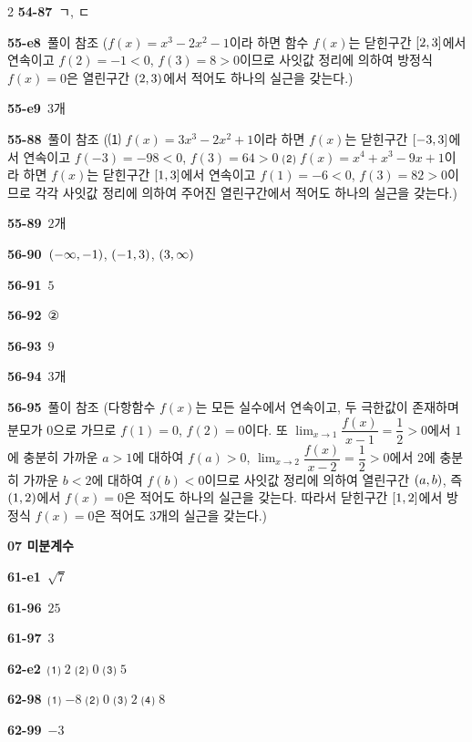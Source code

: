 \documentclass[10pt,a4paper]{article}
\begin{document}
\begin{multicols}{2}
\noindent\textbf{54-87}\ ㄱ, ㄷ\par
\noindent\textbf{55-e8}\ 풀이 참조 ($f(x)=x^3-2x^2-1$이라 하면 함수 $f(x)$는 닫힌구간 $[2{,}\mkern3mu\mathopen{}3]$에서 연속이고 $f(2)=-1<0$, $f(3)=8>0$이므로 사잇값 정리에 의하여 방정식 $f(x)=0$은 열린구간 $(2{,}\mkern3mu\mathopen{}3)$에서 적어도 하나의 실근을 갖는다.)\par
\noindent\textbf{55-e9}\ $3$개\par
\noindent\textbf{55-88}\ 풀이 참조 (⑴ $f(x)=3x^3-2x^2+1$이라 하면 $f(x)$는 닫힌구간 $[-3{,}\mkern3mu\mathopen{}3]$에서 연속이고 $f(-3)=-98<0$, $f(3)=64>0$ ⑵ $f(x)=x^4+x^3-9x+1$이라 하면 $f(x)$는 닫힌구간 $[1{,}\mkern3mu\mathopen{}3]$에서 연속이고 $f(1)=-6<0$, $f(3)=82>0$이므로 각각 사잇값 정리에 의하여 주어진 열린구간에서 적어도 하나의 실근을 갖는다.)\par
\noindent\textbf{55-89}\ $2$개\par
\noindent\textbf{56-90}\ $(-\infty{,}\mkern3mu\mathopen{}-1)$, $(-1{,}\mkern3mu\mathopen{}3)$, $(3{,}\mkern3mu\mathopen{}\infty)$\par
\noindent\textbf{56-91}\ $5$\par
\noindent\textbf{56-92}\ ②\par
\noindent\textbf{56-93}\ $9$\par
\noindent\textbf{56-94}\ $3$개\par
\noindent\textbf{56-95}\ 풀이 참조 (다항함수 $f(x)$는 모든 실수에서 연속이고, 두 극한값이 존재하며 분모가 $0$으로 가므로 $f(1)=0$, $f(2)=0$이다. 또 $\displaystyle\lim_{x\to 1}\dfrac{f(x)}{x-1}=\dfrac{1}{2}>0$에서 $1$에 충분히 가까운 $a>1$에 대하여 $f(a)>0$, $\displaystyle\lim_{x\to 2}\dfrac{f(x)}{x-2}=\dfrac{1}{2}>0$에서 $2$에 충분히 가까운 $b<2$에 대하여 $f(b)<0$이므로 사잇값 정리에 의하여 열린구간 $(a{,}\mkern3mu\mathopen{}b)$, 즉 $(1{,}\mkern3mu\mathopen{}2)$에서 $f(x)=0$은 적어도 하나의 실근을 갖는다. 따라서 닫힌구간 $[1{,}\mkern3mu\mathopen{}2]$에서 방정식 $f(x)=0$은 적어도 $3$개의 실근을 갖는다.)\par
\noindent\textbf{07 미분계수}\par\smallskip
\noindent\textbf{61-e1}\ $\sqrt{7}$\par
\noindent\textbf{61-96}\ $25$\par
\noindent\textbf{61-97}\ $3$\par
\noindent\textbf{62-e2}\ ⑴ $2$ ⑵ $0$ ⑶ $5$\par
\noindent\textbf{62-98}\ ⑴ $-8$ ⑵ $0$ ⑶ $2$ ⑷ $8$\par
\noindent\textbf{62-99}\ $-3$\par

\end{multicols}
\end{document}

